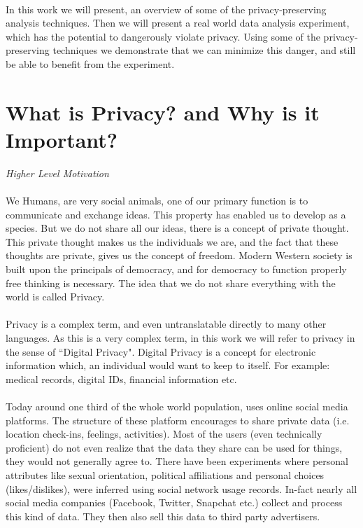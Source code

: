 \documentclass[12pt]{report}
\theoremstyle{named}
\begin{document}
\paragraph{}
In this work we will present, an overview of some of the privacy-preserving analysis techniques. Then we will present a real world data analysis experiment, which has the potential to dangerously violate privacy. Using some of the privacy-preserving techniques we demonstrate that we can minimize this danger, and still be able to benefit from the experiment.


\section{What is Privacy? and Why is it Important?}
\textit{Higher Level Motivation}
\paragraph{}
We Humans, are very social animals, one of our primary function is to communicate and exchange ideas. This property has enabled us to develop as a species. But we do not share all our ideas, there is a concept of private thought. This private thought makes us the individuals we are, and the fact that these thoughts are private, gives us the concept of freedom. Modern Western society is built upon the principals of democracy, and for democracy to function properly free thinking is necessary. The idea that we do not share everything with the world is called Privacy. 
\paragraph{}
Privacy is a complex term, and even untranslatable directly to many other languages. As this is a very complex term, in this work we will refer to privacy in the sense of ``Digital Privacy". Digital Privacy is a concept for electronic information which, an individual would want to keep to itself.  For example: medical records, digital IDs, financial information etc. 
\paragraph{}
Today around one third of the whole world population\cite{SocialMediaPercent}, uses online social media platforms. The structure of these platform encourages to share private data (i.e. location check-ins, feelings, activities). Most of the users (even technically proficient) do not even realize that the data they share can be used for things, they would not generally agree to. There have been experiments where personal attributes like sexual orientation, political affiliations and personal choices (likes/dislikes), were inferred using social network usage records. In-fact nearly all social media companies (Facebook, Twitter, Snapchat etc.) collect and process this kind of data. They then also sell this data to third party advertisers. 
\end{document}
